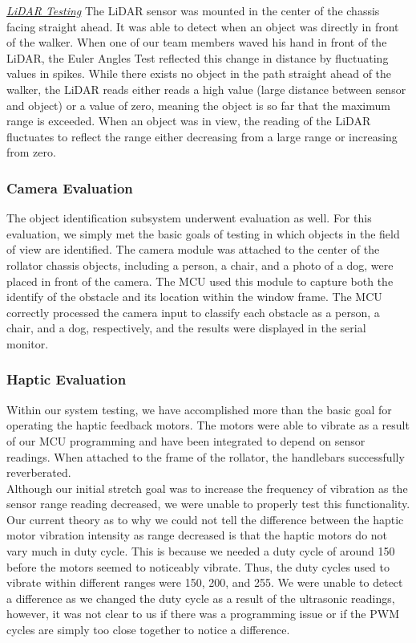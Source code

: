 \noindent \underline{\textit{LiDAR Testing}} \noindent The LiDAR sensor was mounted in the center of the chassis facing straight ahead. It was able to detect when an object was directly in front of the walker. When one of our team members waved his hand in front of the LiDAR, the Euler Angles Test reflected this change in distance by fluctuating values in spikes. While there exists no object in the path straight ahead of the walker, the LiDAR reads either reads a high value (large distance between sensor and object) or a value of zero, meaning the object is so far that the maximum range is exceeded. When an object was in view, the reading of the LiDAR fluctuates to reflect the range either decreasing from a large range or increasing from zero.\\

\subsubsection{Camera Evaluation}
\noindent The object identification subsystem underwent evaluation as well. For this evaluation, we simply met the basic goals of testing in which objects in the field of view are identified. The camera module was attached to the center of the rollator chassis objects, including a person, a chair, and a photo of a dog, were placed in front of the camera. The MCU used this module to capture both the identify of the obstacle and its location within the window frame. The MCU correctly processed the camera input to classify each obstacle as a person, a chair, and a dog, respectively, and the results were displayed in the serial monitor.\\

\subsubsection{Haptic Evaluation}
\noindent Within our system testing, we have accomplished more than the basic goal for operating the haptic feedback motors. The motors were able to vibrate as a result of our MCU programming and have been integrated to depend on sensor readings. When attached to the frame of the rollator, the handlebars successfully reverberated.\\

\noindent Although our initial stretch goal was to increase the frequency of vibration as the sensor range reading decreased, we were unable to properly test this functionality. Our current theory as to why we could not tell the difference between the haptic motor vibration intensity as range decreased is that the haptic motors do not vary much in duty cycle. This is because we needed a duty cycle of around 150 before the motors seemed to noticeably vibrate. Thus, the duty cycles used to vibrate within different ranges were 150, 200, and 255. We were unable to detect a difference as we changed the duty cycle as a result of the ultrasonic readings, however, it was not clear to us if there was a programming issue or if the PWM cycles are simply too close together to notice a difference.\\

